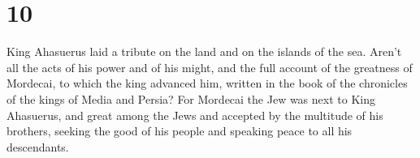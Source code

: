 \hypertarget{section-9}{%
\section{10}\label{section-9}}

 King Ahasuerus laid a tribute on the land and on the
islands of the sea.  Aren't all the acts of his power and of
his might, and the full account of the greatness of Mordecai, to which
the king advanced him, written in the book of the chronicles of the
kings of Media and Persia?  For Mordecai the Jew was next to
King Ahasuerus, and great among the Jews and accepted by the multitude
of his brothers, seeking the good of his people and speaking peace to
all his descendants.
